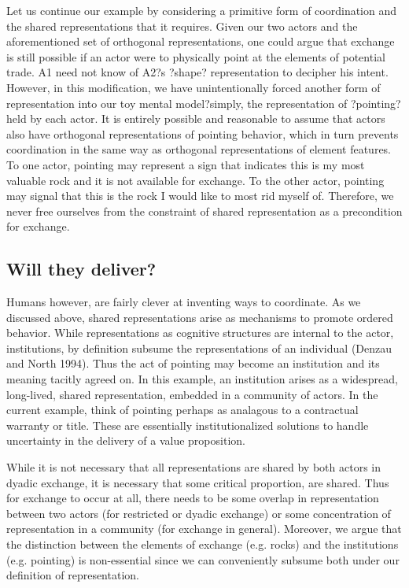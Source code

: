 Let us continue our example by considering a primitive form of coordination and the shared representations that it requires. Given our two actors and the aforementioned set of orthogonal representations, one could argue that exchange is still possible if an actor were to physically point at the elements of potential trade. A1 need not know of A2?s ?shape? representation to decipher his intent. However, in this modification, we have unintentionally forced another form of representation into our toy mental model?simply, the representation of ?pointing? held by each actor. It is entirely possible and reasonable to assume that actors also have orthogonal representations of pointing behavior, which in turn prevents coordination in the same way as orthogonal representations of element features. To one actor, pointing may represent a sign that indicates this is my most valuable rock and it is not available for exchange. To the other actor, pointing may signal that this is the rock I would like to most rid myself of. Therefore, we never free ourselves from the constraint of shared representation as a precondition for exchange. 

\subsection{Will they deliver?}
Humans however, are fairly clever at inventing ways to coordinate. As we discussed above, shared representations arise as mechanisms to promote ordered behavior. While representations as cognitive structures are internal to the actor, institutions, by definition subsume the representations of an individual (Denzau and North 1994). Thus the act of pointing may become an institution and its meaning tacitly agreed on. In this example, an institution arises as a widespread, long-lived, shared representation, embedded in a community of actors. In the current example, think of pointing perhaps as analagous to a contractual warranty or title. These are essentially institutionalized solutions to handle uncertainty in the delivery of a value proposition. 

While it is not necessary that all representations are shared by both actors in dyadic exchange, it is necessary that some critical proportion, are shared. Thus for exchange to occur at all, there needs to be some overlap in representation between two actors (for restricted or dyadic exchange) or some concentration of representation in a community (for exchange in general). Moreover, we argue that the distinction between the elements of exchange (e.g. rocks) and the institutions (e.g. pointing) is non-essential since we can conveniently subsume both under our definition of representation. 

